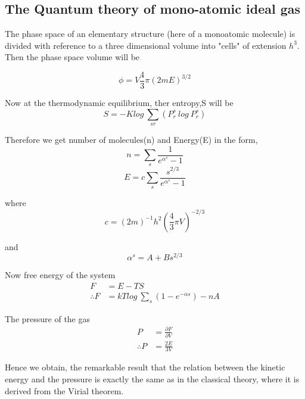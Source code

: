 \documentclass[12pt, letterpaper]{article}
\begin{document}
    \subsection*{The Quantum theory of mono-atomic ideal gas}

    The phase space of an elementary structure (here of a monoatomic molecule) is divided with reference to a three dimensional 
    volume into "cells" of extension $h^{3}$.\\ 
    Then the phase space volume will be 
    
    \begin{equation}
        \phi = V \frac{4}{3}\pi (2mE)^{3/2}
    \end{equation}
    
    Now at the thermodynamic equilibrium, ther entropy,S will be 
    \begin{equation}
        S = - K log \ \sum_{sr} (P^{s}_{r} \ log \ P^{s}_{r})
    \end{equation}

    Therefore we get number of molecules(n) and Energy(E) in the form,  
    \begin{equation}
        n = \sum _{s} \frac{1}{e^{\alpha ^ {s}}-1}
    \end{equation}
    \begin{equation}
        E = c \sum _{s} \frac{s^{2/3}}{e^{\alpha ^ {s}}-1}
    \end{equation}

    where 
    \begin{equation}
        c  = (2m)^{-1}h^{2}(\frac{4}{3}\pi V)^{-2/3}
    \end{equation}

    and 
    \begin{equation}
        \alpha^{s} = A + Bs^{2/3}
    \end{equation}

    Now free energy of the system 
    \begin{align}
        F &= E - TS \\
        \therefore F &= kT{log \ \sum_{s}(1-e^{-\alpha s}) -nA}
    \end{align}

    The pressure of the gas 
    \begin{align}
        P &= \frac{\partial F}{\partial V} \\
        \therefore P &= \frac{2E}{3V}
    \end{align}

    Hence we obtain, the remarkable result that the relation between the kinetic energy and the pressure is exactly the same as in the
    classical theory, where it is derived from the Virial theorem.
    \newpage
\end{document}
